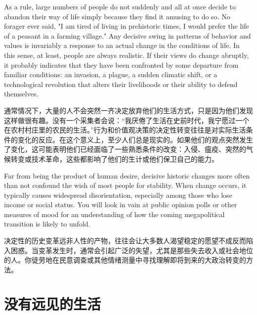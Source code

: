 \begin{Parallel}{97mm}{45mm}
  \ParallelLText
  {As a rule, large numbers of people do not suddenly and all at once decide to abandon their way of life simply because they find it amusing to do so. No forager ever said, "I am tired of living in prehistoric times, I would prefer the life of a peasant in a farming village." Any decisive swing in patterns of behavior and values is invariably a response to an actual change in the conditions of life. In this sense, at least, people are always realistic. If their views do change abruptly, it probably indicates that they have been confronted by some departure from familiar conditions: an invasion, a plague, a sudden climatic shift, or a technological revolution that alters their livelihoods or their ability to defend themselves.}
  
  \ParallelRText
  {通常情况下，大量的人不会突然一齐决定放弃他们的生活方式，只是因为他们发现这样做很有趣。没有一个采集者会说：“我厌倦了生活在史前时代，我宁愿过一个在农村村庄里的农民的生活。”行为和价值观决策的决定性转变往往是对实际生活条件的变化的反应。在这个意义上，至少人们总是现实的。如果他们的观点突然发生了变化，这可能表明他们已经面临了一些熟悉条件的改变：入侵、瘟疫、突然的气候转变或技术革命，这些都影响了他们的生计或他们保卫自己的能力。}
  \ParallelPar


  \ParallelLText
  {Far from being the product of human desire, decisive historic changes more often than not confound the wish of most people for stability. When change occurs, it typically causes widespread disorientation, especially among those who lose income or social status. You will look in vain at public opinion polls or other measures of mood for an understanding of how the coming megapolitical transition is likely to unfold.}
  
  \ParallelRText
  {决定性的历史变革远非人性的产物，往往会让大多数人渴望稳定的愿望不成反而陷入困惑。当变革发生时，通常会引起广泛的失望，尤其是那些失去收入或社会地位的人。你徒劳地在民意调查或其他情绪测量中寻找理解即将到来的大政治转变的方法。}
  \ParallelPar

  \section{没有远见的生活}


\end{Parallel}
